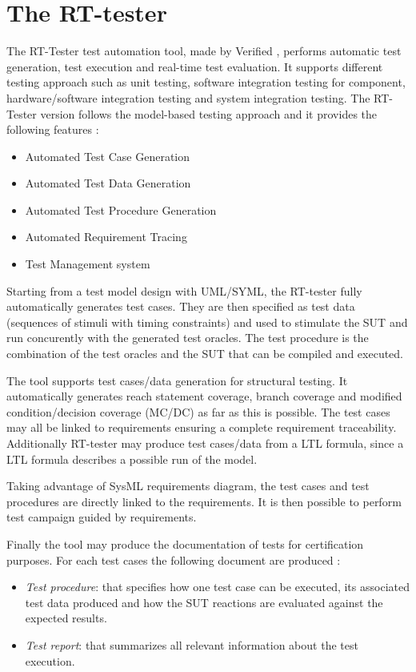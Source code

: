 \section{The RT-tester} 

The RT-Tester test automation tool, made by Verified
\cite{verified_website}, performs automatic test generation, test
execution and real-time test evaluation.  It supports different
testing approach such as unit testing, software integration testing
for component, hardware/software integration testing and system
integration testing.  The RT-Tester version  follows the
model-based testing approach \cite{Peleska2011} and
it provides the following features :
\begin{itemize}
\item Automated Test Case Generation 
\item Automated Test Data Generation 
\item Automated Test Procedure Generation 
\item Automated Requirement Tracing 
\item Test Management system 
\end{itemize}
Starting from a test model design with UML/SYML, the RT-tester fully
automatically generates test cases. They are then specified as test
data (sequences of stimuli with timing constraints) and used to
stimulate the SUT and run concurently with the generated test
oracles. The test procedure is the combination of the test oracles and
the SUT that can be compiled and executed.

The tool supports test cases/data generation for structural
testing. It automatically generates reach statement coverage, branch
coverage and modified condition/decision coverage (MC/DC) as far as
this is possible.  The test cases may all be linked to requirements
ensuring a complete requirement traceability.  Additionally RT-tester
may produce test cases/data from a LTL formula, since a LTL formula
describes a possible run of the model.

Taking advantage of SysML requirements diagram, the test cases and
test procedures are directly linked to the requirements. It is then
possible to perform test campaign guided by requirements.

Finally the tool may produce the documentation of tests for
certification purposes. For each test cases the following document are
produced :
\begin{itemize}
\item {\em Test procedure}: that specifies  how one test case can be
  executed, its associated test data produced and how the SUT
  reactions are evaluated against the expected results.
\item {\em Test report}: that summarizes all relevant information
  about the test execution.
\end{itemize}

